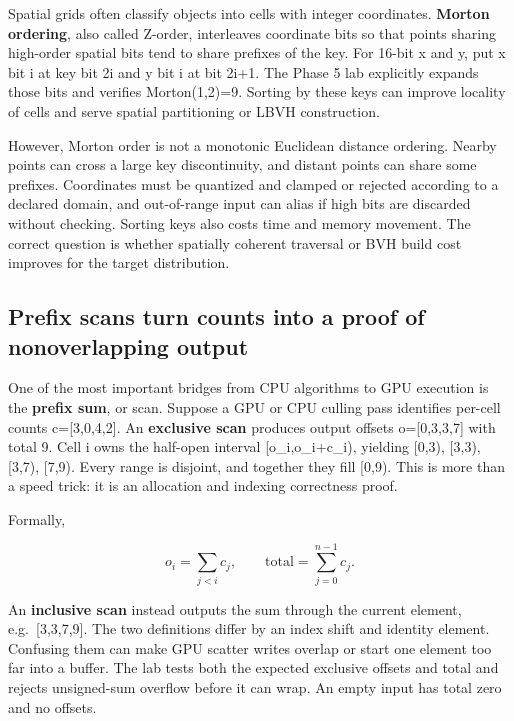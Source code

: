 \hypertarget{01-foundations-i-ch008-morton-keys-turn-2d-proximity-into-a-sortable-integerwithin-limits}{}

Spatial grids often classify objects into cells with integer coordinates. \textbf{Morton ordering}, also called Z-order, interleaves coordinate bits so that points sharing high-order spatial bits tend to share prefixes of the key. For 16-bit x and y, put x bit i at key bit 2i and y bit i at bit 2i+1. The Phase 5 lab explicitly expands those bits and verifies Morton(1,2)=9. Sorting by these keys can improve locality of cells and serve spatial partitioning or LBVH construction.

However, Morton order is not a monotonic Euclidean distance ordering. Nearby points can cross a large key discontinuity, and distant points can share some prefixes. Coordinates must be quantized and clamped or rejected according to a declared domain, and out-of-range input can alias if high bits are discarded without checking. Sorting keys also costs time and memory movement. The correct question is whether spatially coherent traversal or BVH build cost improves for the target distribution.

\subsection{Prefix scans turn counts into a proof of nonoverlapping output}\label{01-foundations-i-ch008-prefix-scans-turn-counts-into-a-proof-of-nonoverlapping-output}

\hypertarget{01-foundations-i-ch008-prefix-scans-turn-counts-into-a-proof-of-nonoverlapping-output}{}

One of the most important bridges from CPU algorithms to GPU execution is the \textbf{prefix sum}, or scan. Suppose a GPU or CPU culling pass identifies per-cell counts c={[}3,0,4,2{]}. An \textbf{exclusive scan} produces output offsets o={[}0,3,3,7{]} with total 9. Cell i owns the half-open interval {[}o\_i,o\_i+c\_i), yielding {[}0,3), {[}3,3), {[}3,7), {[}7,9). Every range is disjoint, and together they fill {[}0,9). This is more than a speed trick: it is an allocation and indexing correctness proof.

Formally,

\[
o_i=\sum_{j<i}c_j,\qquad
\mathrm{total}=\sum_{j=0}^{n-1}c_j.
\]

An \textbf{inclusive scan} instead outputs the sum through the current element, e.g.~{[}3,3,7,9{]}. The two definitions differ by an index shift and identity element. Confusing them can make GPU scatter writes overlap or start one element too far into a buffer. The lab tests both the expected exclusive offsets and total and rejects unsigned-sum overflow before it can wrap. An empty input has total zero and no offsets.

